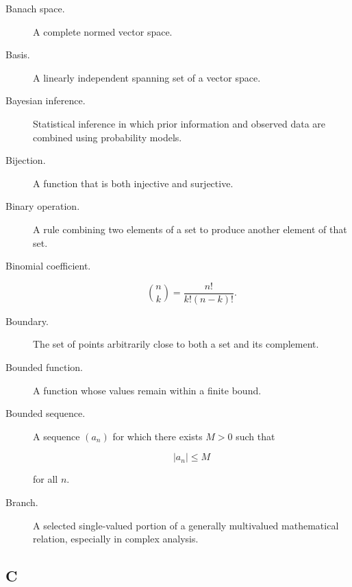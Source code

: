 \begin{description}

\item[Banach space.]
A complete normed vector space.

\item[Basis.]
A linearly independent spanning set of a vector space.

\item[Bayesian inference.]
Statistical inference in which prior information and observed data are
combined using probability models.

\item[Bijection.]
A function that is both injective and surjective.

\item[Binary operation.]
A rule combining two elements of a set to produce another element of that
set.

\item[Binomial coefficient.]

\[
\boxed{
\binom{n}{k}
=
\frac{n!}{k!(n-k)!}.
}
\]

\item[Boundary.]
The set of points arbitrarily close to both a set and its complement.

\item[Bounded function.]
A function whose values remain within a finite bound.

\item[Bounded sequence.]
A sequence \((a_n)\) for which there exists \(M>0\) such that

\[
|a_n|\leq M
\]

for all \(n\).

\item[Branch.]
A selected single-valued portion of a generally multivalued mathematical
relation, especially in complex analysis.

\end{description}

\subsection*{C}

